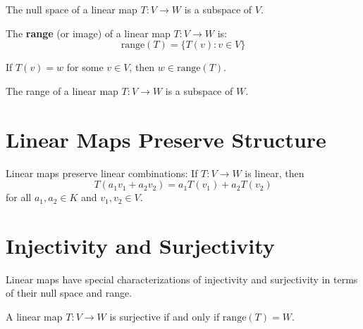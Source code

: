 \begin{theorem}
\label{null-space-subspace}
The null space of a linear map $T : V \to W$ is a subspace of $V$.
\end{theorem}

\begin{definition}
\label{range-def}
The \textbf{range} (or image) of a linear map $T : V \to W$ is:
$$\text{range}(T) = \{T(v) : v \in V\}$$
\end{definition}

\begin{lemma}
\label{mem-range}
If $T(v) = w$ for some $v \in V$, then $w \in \text{range}(T)$.
\end{lemma}

\begin{theorem}
\label{range-subspace}
The range of a linear map $T : V \to W$ is a subspace of $W$.
\end{theorem}

\section{Linear Maps Preserve Structure}

\begin{theorem}
\label{linear-combination-preservation}
Linear maps preserve linear combinations: If $T : V \to W$ is linear, then
$$T(a_1 v_1 + a_2 v_2) = a_1 T(v_1) + a_2 T(v_2)$$
for all $a_1, a_2 \in K$ and $v_1, v_2 \in V$.
\end{theorem}

\section{Injectivity and Surjectivity}

Linear maps have special characterizations of injectivity and surjectivity in terms of their null space and range.

\begin{theorem}
\label{surjective-characterization}
A linear map $T : V \to W$ is surjective if and only if $\text{range}(T) = W$.
\end{theorem}

